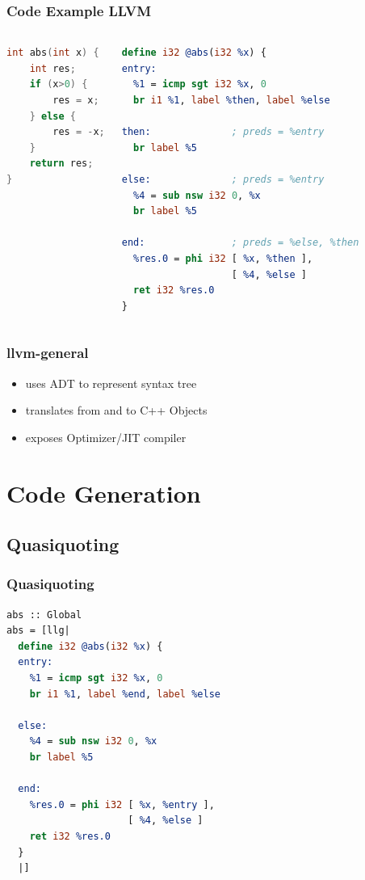 \documentclass[14pt]{beamer}\beamertemplatenavigationsymbolsempty
\begin{document}
\begin{frame}[fragile]
 \frametitle{Code Example LLVM}
\begin{columns}[c]
\begin{lstlisting}[language=C]
int abs(int x) {
    int res;
    if (x>0) {
        res = x;
    } else {
        res = -x;
    }
    return res;
}
\end{lstlisting}
\begin{lstlisting}[language=llvm]
define i32 @abs(i32 %x) {
entry:
  %1 = icmp sgt i32 %x, 0
  br i1 %1, label %then, label %else

then:              ; preds = %entry
  br label %5

else:              ; preds = %entry
  %4 = sub nsw i32 0, %x
  br label %5

end:               ; preds = %else, %then
  %res.0 = phi i32 [ %x, %then ],
                   [ %4, %else ]
  ret i32 %res.0
}
\end{lstlisting}
\end{columns}
\end{frame}

\begin{frame}
\frametitle{llvm-general}
\begin{itemize}
\item uses ADT to represent syntax tree
\item translates from and to C++ Objects
\item exposes Optimizer/JIT compiler
\end{itemize}
\end{frame}

\section{Code Generation}
\subsection{Quasiquoting}
\begin{frame}[fragile]
 \frametitle{Quasiquoting}
\begin{lstlisting}[language=llvm]
abs :: Global
abs = [llg|
  define i32 @abs(i32 %x) {
  entry:
    %1 = icmp sgt i32 %x, 0
    br i1 %1, label %end, label %else

  else:
    %4 = sub nsw i32 0, %x
    br label %5

  end:
    %res.0 = phi i32 [ %x, %entry ],
                     [ %4, %else ]
    ret i32 %res.0
  }
  |]
\end{lstlisting}
\end{frame}
\end{document}
